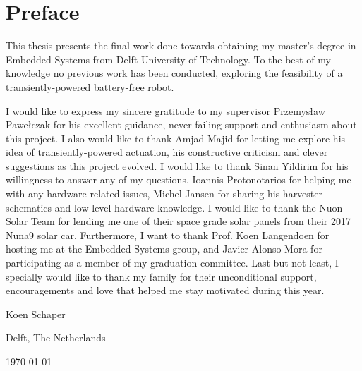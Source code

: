 \chapter*{Preface}

This thesis presents the final work done towards obtaining my master’s degree in Embedded Systems from Delft University of Technology.
To the best of my knowledge no previous work has been conducted, exploring the feasibility of a transiently-powered battery-free robot. 


\vspace{1\baselineskip}

\noindent
I would like to express my sincere gratitude to my supervisor Przemys\l{}aw Pawe\l{}czak for his excellent guidance, never failing support and enthusiasm about this project. 
I also would like to thank Amjad Majid for letting me explore his idea of transiently-powered actuation, his constructive criticism and clever suggestions as this project evolved.
I would like to thank Sinan Yildirim for his willingness to answer any of my questions, Ioannis Protonotarios for helping me with any hardware related issues, Michel Jansen for sharing his harvester schematics and low level hardware knowledge.
I would like to thank the Nuon Solar Team for lending me one of their space grade solar panels from their 2017 Nuna9 solar car.
Furthermore, I want to thank Prof. Koen Langendoen for hosting me at the Embedded Systems group, and Javier Alonso-Mora for participating as a member of my graduation committee.
Last but not least, I specially would like to thank my family for their unconditional support, encouragements and love that helped me stay motivated during this year.

\vspace{1\baselineskip}

\noindent
Koen Schaper

\vspace{1\baselineskip}

\noindent
Delft, The Netherlands

\noindent
\today
